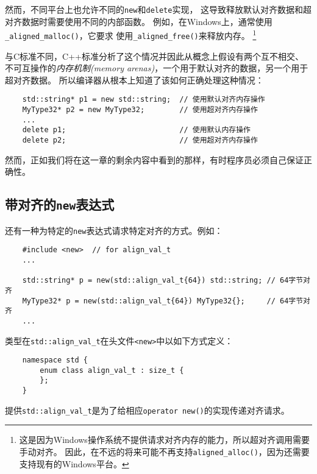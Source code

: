 然而，不同平台上也允许不同的\texttt{new}和\texttt{delete}实现，
这导致释放默认对齐数据和超对齐数据时需要使用不同的内部函数。
例如，在Windows上，通常使用\texttt{\_aligned\_malloc()}，它要求
使用\texttt{\_aligned\_free()}来释放内存。
\footnote{这是因为Windows操作系统不提供请求对齐内存的能力，所以超对齐调用需要手动对齐。
因此，在不远的将来可能不再支持\texttt{aligned\_alloc()}，因为还需要支持现有的Windows平台。}

与C标准不同，C++标准分析了这个情况并因此从概念上假设有两个互不相交、
不可互操作的\emph{内存机制(memory arenas)}，一个用于默认对齐的数据，另一个用于超对齐数据。
所以编译器从根本上知道了该如何正确处理这种情况：
\begin{lstlisting}
    std::string* p1 = new std::string;  // 使用默认对齐内存操作
    MyType32* p2 = new MyType32;        // 使用超对齐内存操作
    ...
    delete p1;                          // 使用默认内存操作
    delete p2;                          // 使用超对齐内存操作
\end{lstlisting}
然而，正如我们将在这一章的剩余内容中看到的那样，有时程序员必须自己保证正确性。

\subsection{带对齐的\texttt{new}表达式}\label{ch30.1.2}
还有一种为特定的\texttt{new}表达式请求特定对齐的方式。例如：
\begin{lstlisting}
    #include <new>  // for align_val_t
    ...

    std::string* p = new(std::align_val_t{64}) std::string; // 64字节对齐
    MyType32* p = new(std::align_val_t{64}) MyType32{};     // 64字节对齐
    ...
\end{lstlisting}
类型在\texttt{std::align\_val\_t}在头文件\texttt{<new>}中以如下方式定义：
\begin{lstlisting}
    namespace std {
        enum class align_val_t : size_t {
        };
    }
\end{lstlisting}
提供\texttt{std::align\_val\_t}是为了给相应\texttt{operator new()}的实现传递对齐请求。

